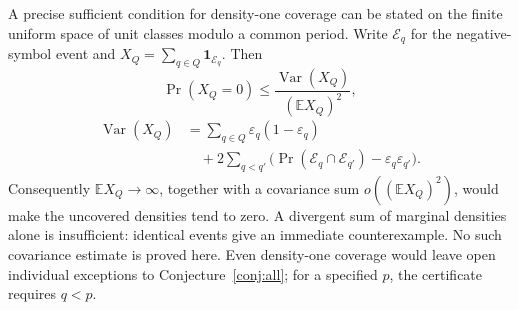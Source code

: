 \documentclass[11pt,a4paper]{amsart}
\theoremstyle{plain}
\theoremstyle{definition}
\begin{document}
A precise sufficient condition for density-one coverage can be stated on the finite uniform space of unit classes modulo a common period. Write \(\mathcal E_q\) for the negative-symbol event and \(X_Q=\sum_{q\in Q}\mathbf1_{\mathcal E_q}\). Then
\[
 \Pr(X_Q=0)\le\frac{\operatorname{Var}(X_Q)}{(\mathbb E X_Q)^2},
\]
\[
 \begin{aligned}
 \operatorname{Var}(X_Q)&=\sum_{q\in Q}\varepsilon_q(1-\varepsilon_q)\\
 &\quad+2\sum_{q<q'}\bigl(\Pr(\mathcal E_q\cap\mathcal E_{q'})-\varepsilon_q\varepsilon_{q'}\bigr).
 \end{aligned}
\]
Consequently \(\mathbb E X_Q\to\infty\), together with a covariance sum \(o((\mathbb E X_Q)^2)\), would make the uncovered densities tend to zero. A divergent sum of marginal densities alone is insufficient: identical events give an immediate counterexample. No such covariance estimate is proved here. Even density-one coverage would leave open individual exceptions to Conjecture~\ref{conj:all}; for a specified \(p\), the certificate requires \(q<p\).
\end{document}
